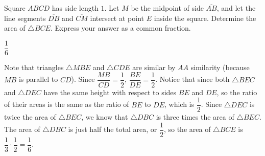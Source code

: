 \documentclass[11pt]{article}
\begin{document}
\begin{problem}
Square $ABCD$ has side length $1$. Let $M$ be the midpoint of side $\overline{AB}$, and let the line segments $\overline{DB}$ and $\overline{CM}$ intersect at point $E$ inside the square. Determine the area of $\triangle BCE$. Express your answer as a common fraction.
\end{problem}

\begin{answer}
$\dfrac{1}{6}$
\end{answer}

\begin{solution}
Note that triangles $\triangle MBE$ and $\triangle CDE$ are similar by $AA$ similarity (because $MB$ is parallel to $CD$). Since $\dfrac{MB}{CD} = \dfrac{1}{2}$, $\dfrac{BE}{DE} = \dfrac{1}{2}$. Notice that since both $\triangle BEC$ and $\triangle DEC$ have the same height with respect to sides $BE$ and $DE$, so the ratio of their areas is the same as the ratio of $BE$ to $DE$, which is $\dfrac12$. Since $\triangle DEC$ is twice the area of $\triangle BEC$, we know that $\triangle DBC$ is three times the area of $\triangle BEC$. The area of $\triangle DBC$ is just half the total area, or $\dfrac{1}{2}$, so the area of $\triangle BCE$ is $\dfrac{1}{3} \cdot \dfrac{1}{2} = \boxed{\dfrac{1}{6}}$.
\end{solution}
\end{document}
